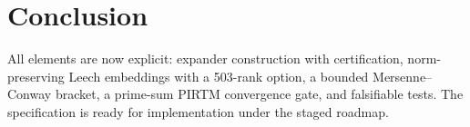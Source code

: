 \documentclass[11pt]{article}
\theoremstyle{definition}
\begin{document}
\section{Conclusion}
All elements are now explicit: expander construction with certification, norm-preserving Leech embeddings with a 503-rank option, a bounded Mersenne--Conway bracket, a prime-sum PIRTM convergence gate, and falsifiable tests. The specification is ready for implementation under the staged roadmap.
\end{document}
